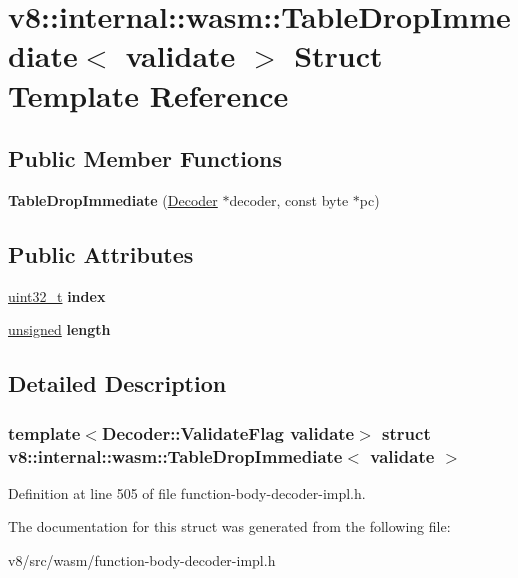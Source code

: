 \hypertarget{structv8_1_1internal_1_1wasm_1_1TableDropImmediate}{}\section{v8\+:\+:internal\+:\+:wasm\+:\+:Table\+Drop\+Immediate$<$ validate $>$ Struct Template Reference}
\label{structv8_1_1internal_1_1wasm_1_1TableDropImmediate}
\subsection*{Public Member Functions}
\begin{DoxyCompactItemize}
\item 
\mbox{\label{structv8_1_1internal_1_1wasm_1_1TableDropImmediate_a722d314e1a746eac4e271c40255ddd08}} 
{\bfseries Table\+Drop\+Immediate} (\mbox{\hyperlink{classv8_1_1internal_1_1wasm_1_1Decoder}{Decoder}} $\ast$decoder, const byte $\ast$pc)
\end{DoxyCompactItemize}
\subsection*{Public Attributes}
\begin{DoxyCompactItemize}
\item 
\mbox{\label{structv8_1_1internal_1_1wasm_1_1TableDropImmediate_abed96a75d71e20361431e56fcee96043}} 
\mbox{\hyperlink{classuint32__t}{uint32\+\_\+t}} {\bfseries index}
\item 
\mbox{\label{structv8_1_1internal_1_1wasm_1_1TableDropImmediate_a851a3a47593eaa8c14d19dc2115ab88c}} 
\mbox{\hyperlink{classunsigned}{unsigned}} {\bfseries length}
\end{DoxyCompactItemize}


\subsection{Detailed Description}
\subsubsection*{template$<$Decoder\+::\+Validate\+Flag validate$>$\newline
struct v8\+::internal\+::wasm\+::\+Table\+Drop\+Immediate$<$ validate $>$}



Definition at line 505 of file function-\/body-\/decoder-\/impl.\+h.



The documentation for this struct was generated from the following file\+:\begin{DoxyCompactItemize}
\item 
v8/src/wasm/function-\/body-\/decoder-\/impl.\+h\end{DoxyCompactItemize}
